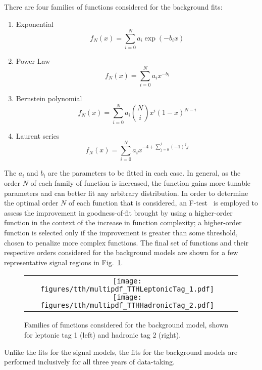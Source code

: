 There are four families of functions considered for the background fits:
\begin{enumerate}
    \item Exponential 
    \begin{equation}
        f_N(x) = \sum_{i=0}^N a_i \exp{(-b_i x)}
    \end{equation}
    \item Power Law
    \begin{equation}
        f_N(x) = \sum_{i=0}^N a_i x^{-b_i}
    \end{equation}
    \item Bernstein polynomial
    \begin{equation}
        f_N(x) = \sum_{i=0}^N a_i \binom{N}{i} x^i (1-x)^{N-i}
    \end{equation}
    \item Laurent series
    \begin{equation}
        f_N(x) = \sum_{i=0}^N a_i x^{-4 + \sum_{j=0}^i (-1)^j j}
    \end{equation}
\end{enumerate}
The $a_i$ and $b_i$ are the parameters to be fitted in each case.
In general, as the order $N$ of each family of function is increased, the function gains more tunable parameters and can better fit any arbitrary distribution.
In order to determine the optimal order $N$ of each function that is considered, an F-test~\cite{fisher_1922} is employed to assess the improvement in goodness-of-fit brought by using a higher-order function in the context of the increase in function complexity; a higher-order function is selected only if the improvement is greater than some threshold, chosen to penalize more complex functions.
The final set of functions and their respective orders considered for the background models are shown for a few representative signal regions in Fig.~\ref{fig:tth_bkg_functions}.
\begin{figure} [h!]
    \centering
    \begin{tabular}{c c}
        \texttt{[image: figures/tth/multipdf\_TTHLeptonicTag\_1.pdf]}
        \texttt{[image: figures/tth/multipdf\_TTHHadronicTag\_2.pdf]}
    \end{tabular}
    \caption{Families of functions considered for the background model, shown for leptonic tag 1 (left) and hadronic tag 2 (right).}
    \label{fig:tth_bkg_functions}
\end{figure}
Unlike the fits for the signal models, the fits for the background models are performed inclusively for all three years of data-taking.
